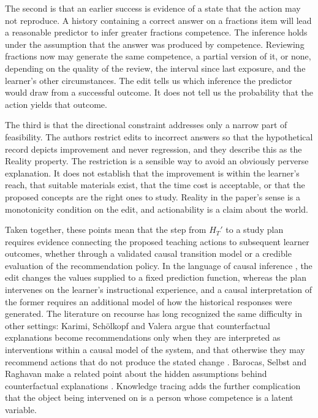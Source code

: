 \documentclass[11pt]{article}
\newcommand{\Hist}{H}
\begin{document}
The second is that an earlier success is evidence of a state that the action may not reproduce. A history containing a correct answer on a fractions item will lead a reasonable predictor to infer greater fractions competence. The inference holds under the assumption that the answer was produced by competence. Reviewing fractions now may generate the same competence, a partial version of it, or none, depending on the quality of the review, the interval since last exposure, and the learner's other circumstances. The edit tells us which inference the predictor would draw from a successful outcome. It does not tell us the probability that the action yields that outcome.

The third is that the directional constraint addresses only a narrow part of feasibility. The authors restrict edits to incorrect answers so that the hypothetical record depicts improvement and never regression, and they describe this as the Reality property. The restriction is a sensible way to avoid an obviously perverse explanation. It does not establish that the improvement is within the learner's reach, that suitable materials exist, that the time cost is acceptable, or that the proposed concepts are the right ones to study. Reality in the paper's sense is a monotonicity condition on the edit, and actionability is a claim about the world.

Taken together, these points mean that the step from $\Hist_T'$ to a study plan requires evidence connecting the proposed teaching actions to subsequent learner outcomes, whether through a validated causal transition model or a credible evaluation of the recommendation policy. In the language of causal inference \citep{pearl2009}, the edit changes the values supplied to a fixed prediction function, whereas the plan intervenes on the learner's instructional experience, and a causal interpretation of the former requires an additional model of how the historical responses were generated. The literature on recourse has long recognized the same difficulty in other settings: Karimi, Sch\"olkopf and Valera argue that counterfactual explanations become recommendations only when they are interpreted as interventions within a causal model of the system, and that otherwise they may recommend actions that do not produce the stated change \citep{karimi2021}. Barocas, Selbst and Raghavan make a related point about the hidden assumptions behind counterfactual explanations \citep{barocas2020}. Knowledge tracing adds the further complication that the object being intervened on is a person whose competence is a latent variable.
\end{document}
